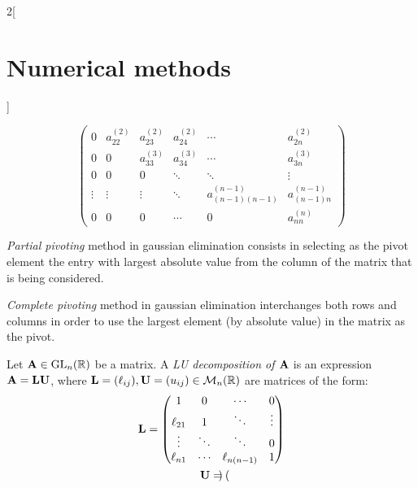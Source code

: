 \documentclass[../../../main.tex]{subfiles}
\begin{document}
\begin{multicols}{2}[\section{Numerical methods}]
\begin{method}
$$\begin{pmatrix}
                0            & a_{22}^{(2)} & a_{23}^{(2)} & a_{24}^{(2)} & \cdots                 & a_{2n}^{(2)}       \\
                0            & 0            & a_{33}^{(3)} & a_{34}^{(3)} & \cdots                 & a_{3n}^{(3)}       \\
                0            & 0            & 0            & \ddots       & \ddots                 & \vdots             \\
                \vdots       & \vdots       & \vdots       & \ddots       & a_{(n-1)(n-1)}^{(n-1)} & a_{(n-1)n}^{(n-1)} \\
                0            & 0            & 0            & \cdots       & 0                      & a_{nn}^{(n)}
            \end{pmatrix}
        $$
    \end{method}
    \begin{method}
        \textit{Partial pivoting} method in gaussian elimination consists in selecting as the pivot element the entry with largest absolute value from the column of the matrix that is being considered.
    \end{method}
    \begin{method}
        \textit{Complete pivoting} method in gaussian elimination interchanges both rows and columns in order to use the largest element (by absolute value) in the matrix as the pivot.
    \end{method}
    \begin{definition}[LU descompostion]
        Let $\vb{A}\in\mathrm{GL}_n(\mathbb{R})$ be a matrix. A \textit{LU decomposition of $\vb{A}$} is an expression $\vb{A}=\vb{L}\vb{U}$, where $\vb{L}=(\ell_{ij}),\vb{U}=(u_{ij})\in\mathcal{M}_n(\mathbb{R})$ are matrices of the form:
        \begin{gather}\label{NM_L}
            \vb{L}=
            \begin{pmatrix}
                1         & 0      & \cdots        & 0      \\
                \ell_{21} & 1      & \ddots        & \vdots \\
                \vdots    & \ddots & \ddots        & 0      \\
                \ell_{n1} & \cdots & \ell_{n(n-1)} & 1
            \end{pmatrix}\\\label{NM_U}
            \vb{U}=
            \begin{pmatrix}

\end{pmatrix}
\end{gather}
\end{definition}
\end{multicols}
\end{document}
